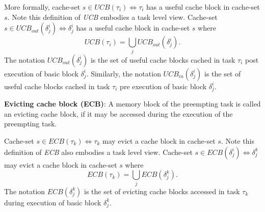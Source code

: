 \noindent More formally, cache-set \begin{math}s \in \textit{UCB}(\tau_{i}) \Leftrightarrow \tau_{i}\end{math} has a useful cache block in cache-set $s$.  Note this definition of \textit{UCB} embodies a task level view.  Cache-set \begin{math}s \in \textit{UCB}_{out}(\delta_{j}^{i}) \Leftrightarrow \delta_{j}^{i}\end{math} has a useful cache block in cache-set $s$ where
\begin{equation}\label{eqn:ucb-task}
    \textit{UCB}(\tau_{i}) = \bigcup_{j} \textit{UCB}_{out}(\delta_{j}^{i}).
\end{equation}
\noindent The notation \begin{math}\textit{UCB}_{out}(\delta_{j}^{i})\end{math} is the set of useful cache blocks cached in task \begin{math}\tau_{i}\end{math} post execution of basic block \begin{math}\delta_{j}^{i}\end{math}.  Similarly, the notation \begin{math}\textit{UCB}_{in}(\delta_{j}^{i})\end{math} is the set of useful cache blocks cached in task \begin{math}\tau_{i}\end{math} pre execution of basic block \begin{math}\delta_{j}^{i}\end{math}.

\begin{definition}
\textbf{Evicting cache block (ECB)}: A memory block of the preempting task is called an evicting cache block, if it may be accessed during the execution of the preempting task.
\end{definition}

\noindent Cache-set \begin{math}s \in \textit{ECB}(\tau_{k}) \Leftrightarrow \tau_{k}\end{math} may evict a cache block in cache-set $s$.  Note this definition of \textit{ECB} also embodies a task level view.  Cache-set \begin{math}s \in \textit{ECB}(\delta_{j}^{i}) \Leftrightarrow \delta_{j}^{k}\end{math} may evict a cache block in cache-set $s$ where
\begin{equation}\label{eqn:ecb-task}
    \textit{ECB}(\tau_{k}) = \bigcup_{j} \textit{ECB}(\delta_{j}^{k}).
\end{equation}
\noindent The notation \begin{math}\textit{ECB}(\delta_{j}^{k})\end{math} is the set of evicting cache blocks accessed in task \begin{math}\tau_{k}\end{math} during execution of basic block \begin{math}\delta_{j}^{k}\end{math}.

